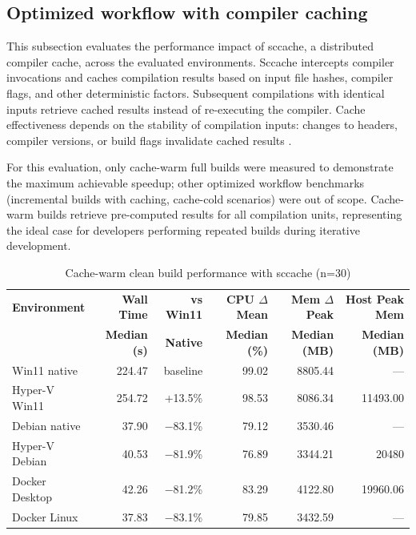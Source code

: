 \subsection{Optimized workflow with compiler caching}
\label{subsec:optimized_workflow}

This subsection evaluates the performance impact of sccache, a distributed compiler cache, across the evaluated environments.
Sccache intercepts compiler invocations and caches compilation results based on input file hashes, compiler flags, and other deterministic factors.
Subsequent compilations with identical inputs retrieve cached results instead of re-executing the compiler.
Cache effectiveness depends on the stability of compilation inputs: changes to headers, compiler versions, or build flags invalidate cached results \citep{mozillaSccacheSharedCompilation2025}.

For this evaluation, only cache-warm full builds were measured to demonstrate the maximum achievable speedup; other optimized workflow benchmarks (incremental builds with caching, cache-cold scenarios) were out of scope.
Cache-warm builds retrieve pre-computed results for all compilation units, representing the ideal case for developers performing repeated builds during iterative development.

\begin{table}[htbp]
    \centering
    \footnotesize
    \begin{tabular}{|l|r|r|r|r|r|}
        \hline
        \textbf{Environment} & \textbf{Wall Time} & \textbf{vs Win11} & \textbf{CPU $\Delta$ Mean} & \textbf{Mem $\Delta$ Peak} & \textbf{Host Peak Mem} \\
        & \textbf{Median (s)} & \textbf{Native} & \textbf{Median (\%)} & \textbf{Median (MB)} & \textbf{Median (MB)} \\
        \hline
        Win11 native & 224.47 & baseline & 99.02 & 8805.44 & --- \\
        Hyper-V Win11 & 254.72 & +13.5\% & 98.53 & 8086.34 & 11493.00 \\
        Debian native & 37.90 & $-$83.1\% & 79.12 & 3530.46 & --- \\
        Hyper-V Debian & 40.53 & $-$81.9\% & 76.89 & 3344.21 & 20480 \\
        Docker Desktop & 42.26 & $-$81.2\% & 83.29 & 4122.80 & 19960.06 \\
        Docker Linux & 37.83 & $-$83.1\% & 79.85 & 3432.59 & --- \\
        \hline
    \end{tabular}
    \caption{Cache-warm clean build performance with sccache (n=30)}
    \label{tab:cmake_build_full_cached_s2}
\end{table}

